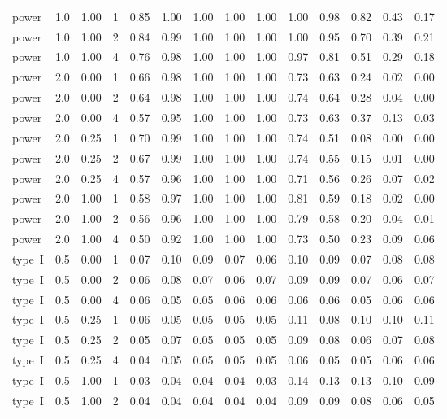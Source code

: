 \begin{table}
\begin{tabular}[t]{lrrrrrrrrrrrrr}
power & 1.0 & 1.00 & 1 & 0.85 & 1.00 & 1.00 & 1.00 & 1.00 & 1.00 & 0.98 & 0.82 & 0.43 & 0.17\\
power & 1.0 & 1.00 & 2 & 0.84 & 0.99 & 1.00 & 1.00 & 1.00 & 1.00 & 0.95 & 0.70 & 0.39 & 0.21\\
power & 1.0 & 1.00 & 4 & 0.76 & 0.98 & 1.00 & 1.00 & 1.00 & 0.97 & 0.81 & 0.51 & 0.29 & 0.18\\
power & 2.0 & 0.00 & 1 & 0.66 & 0.98 & 1.00 & 1.00 & 1.00 & 0.73 & 0.63 & 0.24 & 0.02 & 0.00\\
power & 2.0 & 0.00 & 2 & 0.64 & 0.98 & 1.00 & 1.00 & 1.00 & 0.74 & 0.64 & 0.28 & 0.04 & 0.00\\
power & 2.0 & 0.00 & 4 & 0.57 & 0.95 & 1.00 & 1.00 & 1.00 & 0.73 & 0.63 & 0.37 & 0.13 & 0.03\\
power & 2.0 & 0.25 & 1 & 0.70 & 0.99 & 1.00 & 1.00 & 1.00 & 0.74 & 0.51 & 0.08 & 0.00 & 0.00\\
power & 2.0 & 0.25 & 2 & 0.67 & 0.99 & 1.00 & 1.00 & 1.00 & 0.74 & 0.55 & 0.15 & 0.01 & 0.00\\
power & 2.0 & 0.25 & 4 & 0.57 & 0.96 & 1.00 & 1.00 & 1.00 & 0.71 & 0.56 & 0.26 & 0.07 & 0.02\\
power & 2.0 & 1.00 & 1 & 0.58 & 0.97 & 1.00 & 1.00 & 1.00 & 0.81 & 0.59 & 0.18 & 0.02 & 0.00\\
power & 2.0 & 1.00 & 2 & 0.56 & 0.96 & 1.00 & 1.00 & 1.00 & 0.79 & 0.58 & 0.20 & 0.04 & 0.01\\
power & 2.0 & 1.00 & 4 & 0.50 & 0.92 & 1.00 & 1.00 & 1.00 & 0.73 & 0.50 & 0.23 & 0.09 & 0.06\\
type~I & 0.5 & 0.00 & 1 & 0.07 & 0.10 & 0.09 & 0.07 & 0.06 & 0.10 & 0.09 & 0.07 & 0.08 & 0.08\\
type~I & 0.5 & 0.00 & 2 & 0.06 & 0.08 & 0.07 & 0.06 & 0.07 & 0.09 & 0.09 & 0.07 & 0.06 & 0.07\\
type~I & 0.5 & 0.00 & 4 & 0.06 & 0.05 & 0.05 & 0.06 & 0.06 & 0.06 & 0.06 & 0.05 & 0.06 & 0.06\\
type~I & 0.5 & 0.25 & 1 & 0.06 & 0.05 & 0.05 & 0.05 & 0.05 & 0.11 & 0.08 & 0.10 & 0.10 & 0.11\\
type~I & 0.5 & 0.25 & 2 & 0.05 & 0.07 & 0.05 & 0.05 & 0.05 & 0.09 & 0.08 & 0.06 & 0.07 & 0.08\\
type~I & 0.5 & 0.25 & 4 & 0.04 & 0.05 & 0.05 & 0.05 & 0.05 & 0.06 & 0.05 & 0.05 & 0.06 & 0.06\\
type~I & 0.5 & 1.00 & 1 & 0.03 & 0.04 & 0.04 & 0.04 & 0.03 & 0.14 & 0.13 & 0.13 & 0.10 & 0.09\\
type~I & 0.5 & 1.00 & 2 & 0.04 & 0.04 & 0.04 & 0.04 & 0.04 & 0.09 & 0.09 & 0.08 & 0.06 & 0.05\\

\end{tabular}
\end{table}
